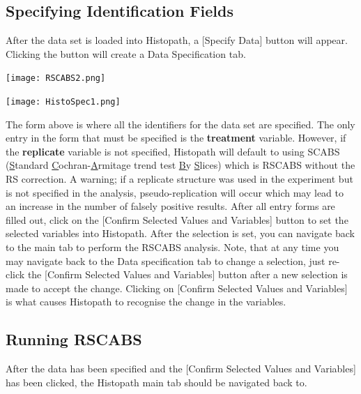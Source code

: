 \documentclass[a4paper]{article}
\begin{document}
\subsection*{Specifying Identification Fields}
\label{subsec:IDfields}

 After the data set is loaded into Histopath, a [Specify Data] button will appear.  
 Clicking the button will create a Data Specification tab.  

 \begin{center}
\texttt{[image: RSCABS2.png]}
\end{center} 
   
\begin{center}
\texttt{[image: HistoSpec1.png]}
\end{center} 
\par

The form above is where all the identifiers for the data set are specified. 
The only entry in the form that must be specified is the \textbf{treatment} variable. However, if the \textbf{replicate} variable is not
specified, Histopath will default to using SCABS (\underline{S}tandard \underline{C}ochran-\underline{A}rmitage trend test \underline{B}y \underline{S}lices) 
 which is RSCABS without the RS correction. A warning; if
a replicate structure was used in the experiment but is not specified in the analysis, pseudo-replication will occur 
which may lead to an increase in the number of  
falsely positive results. After all entry forms are filled out, click on the [Confirm Selected Values 
and Variables] button to set the selected variables into Histopath. After the selection is set, you can navigate back to the main tab to 
perform the RSCABS analysis.  Note, that at any time you may navigate back to the Data specification tab to change a selection, just re-click 
the [Confirm Selected Values and Variables] button after a new selection is made to accept the change.  Clicking on [Confirm Selected Values and Variables] is what causes 
Histopath to recognise the change in the variables.  
     
\subsection*{Running RSCABS}
\label{subsec:RunRSCABS}
 
After the data has been specified and the [Confirm Selected Values and Variables] has been clicked, 
the Histopath main tab should be navigated back to. 
\end{document}
